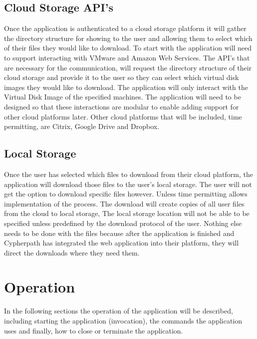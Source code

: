\documentclass{article}
\begin{document}
        \subsection{Cloud Storage API's}
        Once the application is authenticated to a cloud storage platform it will gather the directory structure for showing to the user and allowing them to select
        which of their files they would like to download. To start with the application will need to support interacting with VMware and Amazon Web Services. The API's
        that are necessary for the communication, will request the directory structure of their cloud storage and provide it to the user so they can select which virtual disk
        images they would like to download. The application will only interact with the Virtual Disk Image of the specified machines. The application will need to be designed so 
        that these interactions are modular to enable adding support for other cloud platforms later. Other cloud platforms that will be included, time permitting, are 
        Citrix, Google Drive and Dropbox.


        \subsection{Local Storage}
        Once the user has selected which files to download from their cloud platform, the application will download those
        files to the user's local storage. The user will not get the option to download specific files however. Unless time permitting
        allows implementation of the process. The download will create copies of all user files from the cloud to local storage, 
        The local storage location will not be able to be specified unless predefined by the download protocol of the user. Nothing else 
        needs to be done with the files because after the application is finished and Cypherpath has integrated the web application into 
        their platform, they will direct the downloads where they need them.


    \section{Operation}
    In the following sections the operation of the application will be described, including starting the application
    (invocation), the commands the application uses and finally, how to close or terminate the application.
\end{document}
